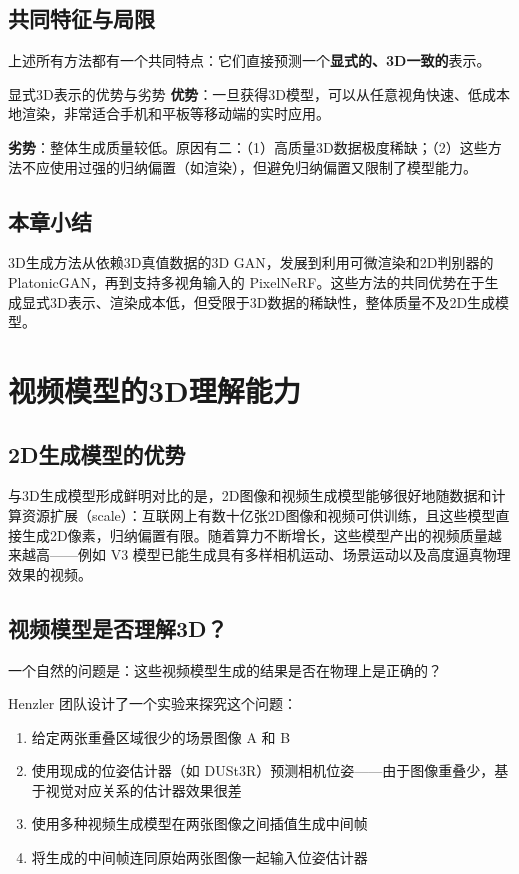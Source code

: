 \documentclass[a4paper]{article}
\begin{document}
\subsection{共同特征与局限}

上述所有方法都有一个共同特点：它们直接预测一个\textbf{显式的、3D一致的}表示。

\begin{importantbox}{显式3D表示的优势与劣势}
\textbf{优势}：一旦获得3D模型，可以从任意视角快速、低成本地渲染，非常适合手机和平板等移动端的实时应用。

\textbf{劣势}：整体生成质量较低。原因有二：（1）高质量3D数据极度稀缺；（2）这些方法不应使用过强的归纳偏置（如渲染），但避免归纳偏置又限制了模型能力。
\end{importantbox}

\subsection{本章小结}

3D生成方法从依赖3D真值数据的3D GAN，发展到利用可微渲染和2D判别器的 PlatonicGAN，再到支持多视角输入的 PixelNeRF。这些方法的共同优势在于生成显式3D表示、渲染成本低，但受限于3D数据的稀缺性，整体质量不及2D生成模型。

\section{视频模型的3D理解能力}

\subsection{2D生成模型的优势}

与3D生成模型形成鲜明对比的是，2D图像和视频生成模型能够很好地随数据和计算资源扩展（scale）：互联网上有数十亿张2D图像和视频可供训练，且这些模型直接生成2D像素，归纳偏置有限。随着算力不断增长，这些模型产出的视频质量越来越高——例如 V3 模型已能生成具有多样相机运动、场景运动以及高度逼真物理效果的视频。

\subsection{视频模型是否理解3D？}

一个自然的问题是：这些视频模型生成的结果是否在物理上是正确的？

Henzler 团队设计了一个实验来探究这个问题：

\begin{enumerate}
    \item 给定两张重叠区域很少的场景图像 A 和 B
    \item 使用现成的位姿估计器（如 DUSt3R）预测相机位姿——由于图像重叠少，基于视觉对应关系的估计器效果很差
    \item 使用多种视频生成模型在两张图像之间插值生成中间帧
    \item 将生成的中间帧连同原始两张图像一起输入位姿估计器
\end{enumerate}
\end{document}
